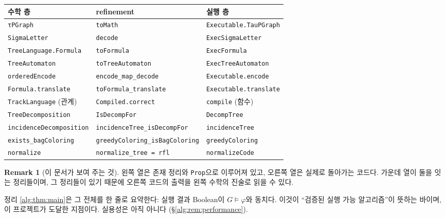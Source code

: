 \documentclass[11pt]{article}
\theoremstyle{definition}
\newtheorem{remark}[definition]{Remark}
\theoremstyle{plain}
\newcommand{\lean}[1]{\texttt{#1}}
\begin{document}
\begin{center}
\begin{tabular}{p{}p{}p{}}
\hline
수학 층 & refinement & 실행 층 \\
\hline
\lean{τPGraph} & \lean{toMath} & \lean{Executable.TauPGraph} \\
\lean{SigmaLetter} & \lean{decode} & \lean{ExecSigmaLetter} \\
\lean{TreeLanguage.Formula} & \lean{toFormula} & \lean{ExecFormula} \\
\lean{TreeAutomaton} & \lean{toTreeAutomaton} & \lean{ExecTreeAutomaton} \\
\lean{orderedEncode} & \lean{encode\_map\_decode} & \lean{Executable.encode} \\
\lean{Formula.translate} & \lean{toFormula\_translate} & \lean{Executable.translate} \\
\lean{TrackLanguage} (관계) & \lean{Compiled.correct} & \lean{compile} (함수) \\
\lean{TreeDecomposition} & \lean{IsDecompFor} & \lean{DecompTree} \\
\lean{incidenceDecomposition} & \lean{incidenceTree\_isDecompFor} & \lean{incidenceTree} \\
\lean{exists\_bagColoring} & \lean{greedyColoring\_isBagColoring} & \lean{greedyColoring} \\
\lean{normalize} & \lean{normalize\_tree = rfl} & \lean{normalizeCode} \\
\hline
\end{tabular}
\end{center}

\begin{remark}[이 문서가 보여 주는 것]
왼쪽 열은 존재 정리와 \lean{Prop}으로 이루어져 있고, 오른쪽 열은 실제로
돌아가는 코드다. 가운데 열이 둘을 잇는 정리들이며, 그 정리들이 있기 때문에
오른쪽 코드의 출력을 왼쪽 수학의 진술로 읽을 수 있다.

정리 \ref{alg:thm:main}은 그 전체를 한 줄로 요약한다: 실행 결과 Boolean이
$G \models \varphi$와 동치다. 이것이 ``검증된 실행 가능 알고리즘''이 뜻하는
바이며, 이 프로젝트가 도달한 지점이다. 실용성은 아직 아니다
(\S\ref{alg:rem:performance}).
\end{remark}
\end{document}
